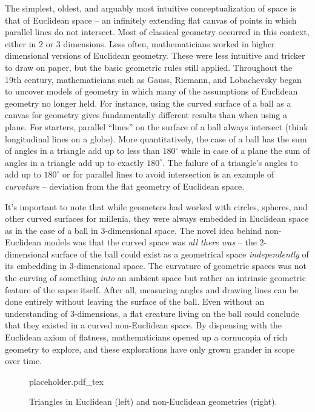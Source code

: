 The simplest, oldest, and arguably most intuitive conceptualization of space is that of Euclidean space -- an infinitely extending flat canvas of points in which parallel lines do not intersect. Most of classical geometry occurred in this context, either in $2$ or $3$ dimensions.
Less often, mathematicians worked in higher dimensional versions of Euclidean geometry. These were less intuitive and tricker to draw on paper, but the basic geometric rules still applied.
Throughout the 19th century, mathematicians such as Gauss, Riemann, and Lobachevsky began to uncover models of geometry in which many of the assumptions of Euclidean geometry no longer held.
For instance, using the curved surface of a ball as a canvas for geometry gives fundamentally different results than when using a plane. For starters, parallel ``lines'' on the surface of a ball always intersect (think longitudinal lines on a globe).
More quantitatively, the case of a ball has the sum of angles in a triangle add up to less than $180^\circ$ while in case of a plane the sum of angles in a triangle add up to exactly $180^\circ$. The failure of a triangle's angles to add up to $180^\circ$ or for parallel lines to avoid intersection is an example of \emph{curvature} -- deviation from the flat geometry of Euclidean space.

It's important to note that while geometers had worked with circles, spheres, and other curved surfaces for millenia, they were always embedded in Euclidean space as in the case of a ball in $3$-dimensional space. The novel idea behind non-Euclidean models was that the curved space was \emph{all there was} -- the $2$-dimensional surface of the ball could exist as a geometrical space \emph{independently} of its embedding in $3$-dimensional space.
The curvature of geometric spaces was not the curving of something \emph{into} an ambient space but rather an intrinsic geometric feature of the sapce itself. After all, measuring angles and drawing lines can be done entirely without leaving the surface of the ball. Even without an understanding of $3$-dimensions, a flat creature living on the ball could conclude that they existed in a curved non-Euclidean space.
By dispensing with the Euclidean axiom of flatness, mathematicians opened up a cornucopia of rich geometry to explore, and these explorations have only grown grander in scope over time.

\begin{figure}[ht]
	\centering
	{placeholder.pdf_tex}
	\caption{Triangles in Euclidean (left) and non-Euclidean geometries (right).}
\end{figure}

